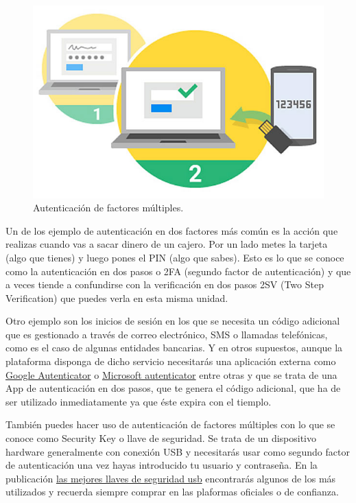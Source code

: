 \documentclass[
  spanish,
  a4paper,
  openany]{book}
\begin{document}
\begin{figure}

{\centering \includegraphics[width=0.5\linewidth]{images/autenticación-factor-múltiple} 

}

\caption{Autenticación de factores múltiples.}\label{fig:unnamed-chunk-14}
\end{figure}

Un de los ejemplo de autenticación en dos factores más común es la acción que realizas cuando vas a sacar dinero de un cajero. Por un lado metes la tarjeta (algo que tienes) y luego pones el PIN (algo que sabes). Esto es lo que se conoce como la autenticación en dos pasos o 2FA (segundo factor de autenticación) y que a veces tiende a confundirse con la verificación en dos pasos 2SV (Two Step Verification) que puedes verla en esta misma unidad.

Otro ejemplo son los inicios de sesión en los que se necesita un código adicional que es gestionado a través de correo electrónico, SMS o llamadas telefónicas, como es el caso de algunas entidades bancarias. Y en otros supuestos, aunque la plataforma disponga de dicho servicio necesitarás una aplicación externa como \href{https://support.google.com/accounts/answer/1066447?co=GENIE.Platform\%3DAndroid\&hl=es-419}{Google Autenticator} o \href{https://www.microsoft.com/es-es/account/authenticator}{Microsoft autenticator} entre otras y que se trata de una App de autenticación en dos pasos, que te genera el código adicional, que ha de ser utilizado inmediatamente ya que éste expira con el tiemplo.

También puedes hacer uso de autenticación de factores múltiples con lo que se conoce como Security Key o llave de seguridad. Se trata de un dispositivo hardware generalmente con conexión USB y necesitarás usar como segundo factor de autenticación una vez hayas introducido tu usuario y contraseña. En la publicación \href{https://es.digitaltrends.com/computadoras/las-mejores-llaves-de-seguridad-usb/}{las mejores llaves de seguridad usb} encontrarás algunos de los más utilizados y recuerda siempre comprar en las plaformas oficiales o de confianza.
\end{document}
